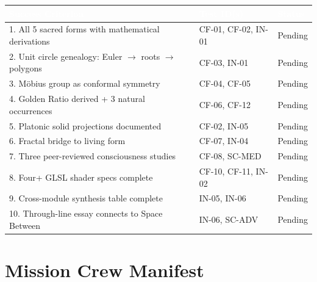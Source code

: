 \documentclass[11pt,letterpaper]{article}
\newcommand{\tableheader}[1]{\textbf{\sffamily\textcolor{white}{#1}}}
\begin{document}
\begin{center}
\begin{tabularx}{\textwidth}{XL{4cm}C{1.8cm}}
\toprule
{}
\tableheader{Success Criterion} & \tableheader{Test ID(s)} & \tableheader{Status} \\
. All 5 sacred forms with mathematical derivations & CF-01, CF-02, IN-01 & Pending \\
2. Unit circle genealogy: Euler $\to$ roots $\to$ polygons & CF-03, IN-01 & Pending \\
3. M\"{o}bius group as conformal symmetry & CF-04, CF-05 & Pending \\
4. Golden Ratio derived + 3 natural occurrences & CF-06, CF-12 & Pending \\
5. Platonic solid projections documented & CF-02, IN-05 & Pending \\
6. Fractal bridge to living form & CF-07, IN-04 & Pending \\
7. Three peer-reviewed consciousness studies & CF-08, SC-MED & Pending \\
8. Four+ GLSL shader specs complete & CF-10, CF-11, IN-02 & Pending \\
9. Cross-module synthesis table complete & IN-05, IN-06 & Pending \\
10. Through-line essay connects to Space Between & IN-06, SC-ADV & Pending \\
\bottomrule
\end{tabularx}
\end{center}

\section{Mission Crew Manifest}
\end{document}
